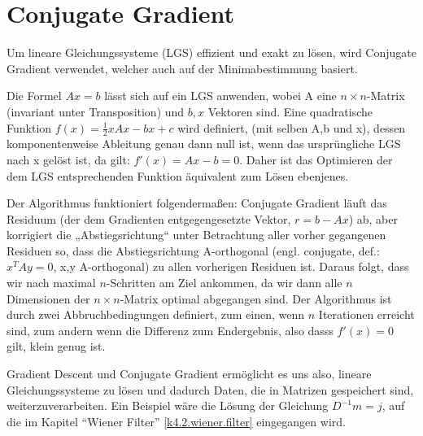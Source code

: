 \section{Conjugate Gradient}

Um lineare Gleichungssysteme (LGS) effizient und exakt zu lösen, wird Conjugate Gradient verwendet, welcher auch auf der Minimabestimmung basiert.


Die Formel $Ax = b$ lässt sich auf ein LGS anwenden, wobei A eine $ n \times n $-Matrix (invariant unter Transposition) und $ b,x $ Vektoren sind. Eine quadratische Funktion $ f(x) = \frac{1}{2}xAx-bx+c $ wird definiert, (mit selben A,b und x), dessen komponentenweise Ableitung genau dann null ist, wenn das ursprüngliche LGS nach x gelöst ist, da gilt: $f'(x) = Ax-b = 0$. Daher ist das Optimieren der dem LGS entsprechenden Funktion äquivalent zum Lösen ebenjenes.


Der Algorithmus funktioniert folgendermaßen: Conjugate Gradient läuft das Residuum (der dem Gradienten entgegengesetzte Vektor, $ r = b-Ax $) ab, aber korrigiert die „Abstiegsrichtung“ unter Betrachtung aller vorher gegangenen Residuen so, dass die Abstiegsrichtung A-orthogonal (engl. conjugate, def.: $x^{T}Ay = 0$, x,y A-orthogonal) zu allen vorherigen Residuen ist. Daraus folgt, dass wir nach maximal $n$-Schritten am Ziel ankommen, da wir dann alle $n$ Dimensionen der $ n \times n $-Matrix optimal abgegangen sind. Der Algorithmus ist durch zwei Abbruchbedingungen definiert, zum einen, wenn $n$ Iterationen erreicht sind, zum andern wenn die Differenz zum Endergebnis, also dasss $ f'(x) = 0 $ gilt, klein genug ist.

Gradient Descent und Conjugate Gradient ermöglicht es uns also, lineare Gleichungssysteme zu lösen und dadurch Daten, die in Matrizen gespeichert sind, weiterzuverarbeiten. Ein Beispiel wäre die Lösung der Gleichung $ D^{-1} m = j $, auf die im Kapitel \enquote{Wiener Filter} \cref{k4.2.wiener.filter} eingegangen wird.
